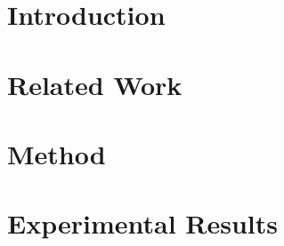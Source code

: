 \documentclass[sigconf]{acmart}  %
\begin{document}

\maketitle

\section{Introduction} \label{sec:intro}




% 

\section{Related Work} \label{sec:relatedWork}



\section{Method} \label{sec:method}



\section{Experimental Results} \label{sec:results}


\end{document}
